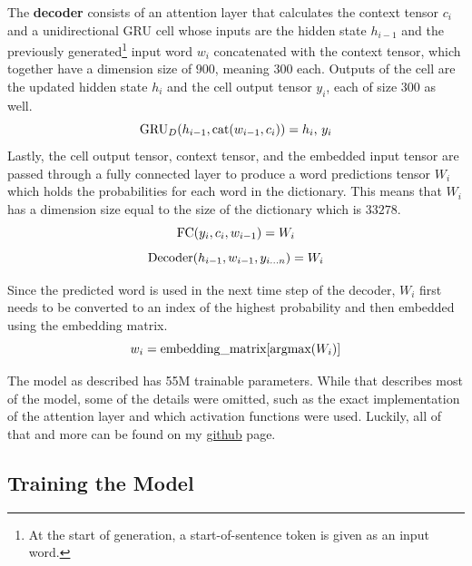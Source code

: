 \documentclass{article}
\begin{document}
The \textbf{decoder} consists of an attention layer that calculates the context tensor $c_i$ and a unidirectional GRU cell whose inputs are the hidden state $h_{i-1}$ and the previously generated\footnote{At the start of generation, a start-of-sentence token is given as an input word.} input word $w_i$ concatenated with the context tensor, which together have a dimension size of $900$, meaning $300$ each. Outputs of the cell are the updated hidden state $h_i$ and the cell output tensor $y_i$, each of size $300$ as well.
\begin{equation}
    \textnormal{GRU}_D(h_{i - 1}, \textnormal{cat}(w_{i-1}, c_i)) = h_i\textnormal{, }y_i
\end{equation}
Lastly, the cell output tensor, context tensor, and the embedded input tensor are passed through a fully connected layer to produce a word predictions tensor $W_i$ which holds the probabilities for each word in the dictionary. This means that $W_i$ has a dimension size equal to the size of the dictionary which is $33278$.
\begin{equation}
    \textnormal{FC}(y_i, c_i, w_{i-1}) = W_i
\end{equation}
\begin{equation}
    \textnormal{Decoder}(h_{i - 1}, w_{i-1}, y_{i...n}) = W_i
\end{equation}

Since the predicted word is used in the next time step of the decoder, $W_i$ first needs to be converted to an index of the highest probability and then embedded using the embedding matrix.
\begin{equation}
    w_i = \textnormal{embedding\_matrix}[\textnormal{argmax}(W_i)]
\end{equation}

The model as described has 55M trainable parameters. While that describes most of the model, some of the details were omitted, such as the exact implementation of the attention layer and which activation functions were used. Luckily, all of that and more can be found on my \href{https://github.com/dominik-matic/nlp-seq2seq-title-generation}{github} page.



\subsection{Training the Model}
\end{document}
